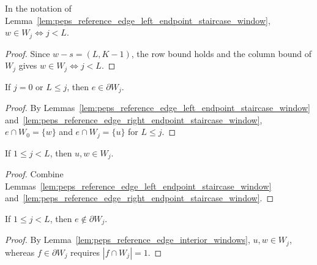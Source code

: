 \begin{lemma}%
    \label{lem:peps_reference_edge_right_endpoint_staircase_window}
    \leanok
    In the notation of Lemma~\ref{lem:peps_reference_edge_left_endpoint_staircase_window},
    $w\in W_j\iff j<L$.
\end{lemma}
\begin{proof}\leanok
    Since $w-s=(L,K-1)$, the row bound holds and the column bound of $W_j$ gives
    $w\in W_j\iff j<L$.
\end{proof}

\begin{lemma}%
    \label{lem:peps_reference_edge_boundary_windows}
    \leanok
    If $j=0$ or $L\le j$, then $e\in\partial W_j$.
\end{lemma}
\begin{proof}\leanok
    By Lemmas~\ref{lem:peps_reference_edge_left_endpoint_staircase_window}
    and~\ref{lem:peps_reference_edge_right_endpoint_staircase_window},
    $e\cap W_0=\{w\}$ and $e\cap W_j=\{u\}$ for $L\le j$.
\end{proof}

\begin{lemma}%
    \label{lem:peps_reference_edge_interior_windows}
    \leanok
    If $1\le j<L$, then $u,w\in W_j$.
\end{lemma}
\begin{proof}\leanok
    Combine Lemmas~\ref{lem:peps_reference_edge_left_endpoint_staircase_window}
    and~\ref{lem:peps_reference_edge_right_endpoint_staircase_window}.
\end{proof}

\begin{lemma}%
    \label{lem:peps_reference_edge_not_boundary_interior_windows}
    \leanok
    If $1\le j<L$, then $e\notin\partial W_j$.
\end{lemma}
\begin{proof}\leanok
    By Lemma~\ref{lem:peps_reference_edge_interior_windows}, $u,w\in W_j$,
    whereas $f\in\partial W_j$ requires $|f\cap W_j|=1$.
\end{proof}
